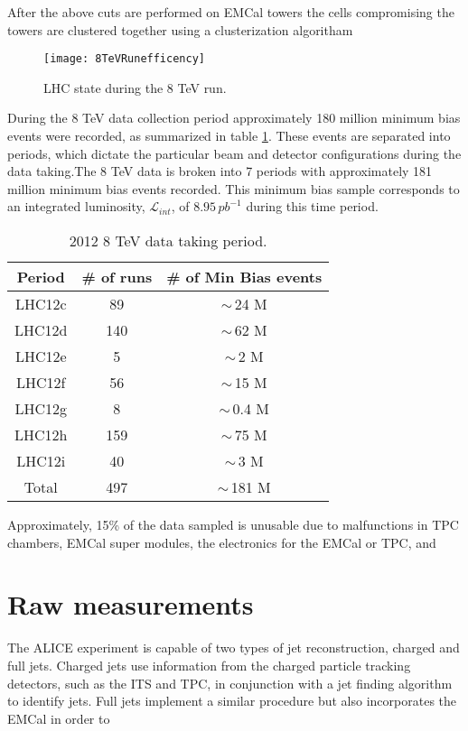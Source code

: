 After the above cuts are performed on EMCal towers the cells compromising the towers are clustered together using a clusterization algoritham 



\begin{figure}[h]
\texttt{[image: 8TeVRunefficency]}
\centering
\caption{LHC state during the 8 TeV run. }
\label{fig:RunEff}
\end{figure}

During the 8 TeV data collection period approximately 180 million minimum bias events were recorded, as summarized in table \ref{tab:RunSummary}.  These events are separated into periods, which dictate the particular beam and detector configurations during the data taking.The 8 TeV data is broken into 7 periods with approximately 181 million minimum bias events recorded.  This minimum bias sample corresponds to an integrated luminosity, $\mathscr{L}_{int}$, of $8.95 \, pb^{-1}$ during this time period\cite{ALICE-PUBLIC-2017-002}.

\begin{table}[hb]
\label{tab:RunSummary}
\begin{center}
\begin{tabular}[b]{|c|c|c|}
	\hline
	Period & \# of runs & \# of Min Bias events \\ \hline
	LHC12c & 89 & $\sim \,$24 M \\ \hline
	LHC12d & 140 & $\sim \,$62 M \\ \hline
	LHC12e & 5 & $\sim \,$2 M \\ \hline
	LHC12f & 56 & $\sim \,$15 M \\ \hline
	LHC12g & 8 & $\sim \,$0.4 M \\ \hline
	LHC12h & 159 & $\sim \,$75 M \\ \hline
	LHC12i & 40 & $\sim \,$3 M \\ \hline
	Total & 497 & $\sim \,$181 M \\ \hline

\end{tabular}
\end{center}
\caption{2012 8 TeV data taking period.}
\end{table}

Approximately, 15\% of the data sampled is unusable due to malfunctions in TPC chambers, EMCal super modules, the electronics for the EMCal or TPC, and   
\section{Raw measurements}
The ALICE experiment is capable of two types of jet reconstruction, charged and full jets.  Charged jets use information from the charged particle tracking detectors, such as the ITS and TPC, in conjunction with a jet finding algorithm to identify jets.  Full jets implement a similar procedure but also incorporates the EMCal in order to 

